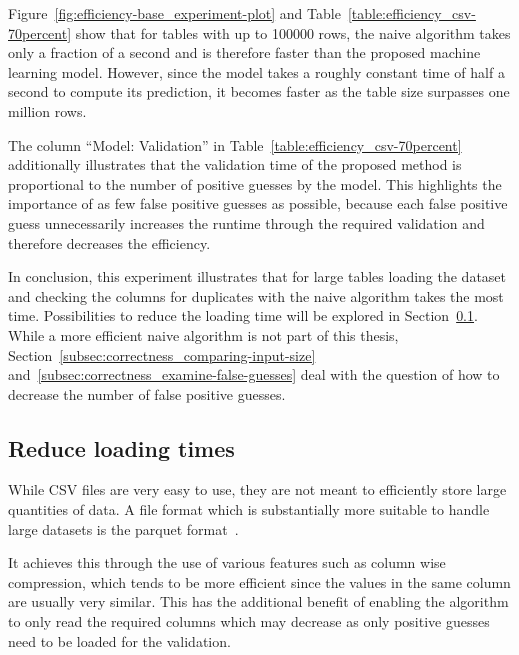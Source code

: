 Figure~\ref{fig:efficiency-base_experiment-plot} and Table~\ref{table:efficiency_csv-70percent} show that for tables with up to \num{100000} rows, the naive algorithm takes only a fraction of a second and is therefore faster than the proposed machine learning model. However, since the model takes a roughly constant time of half a second to compute its prediction, it becomes faster as the table size surpasses one million rows.

The column \enquote{Model: Validation} in Table~\ref{table:efficiency_csv-70percent} additionally illustrates that the validation time of the proposed method is proportional to the number of positive guesses by the model. This highlights the importance of as few false positive guesses as possible, because each false positive guess unnecessarily increases the runtime through the required validation and therefore decreases the efficiency.

In conclusion, this experiment illustrates that for large tables loading the dataset and checking the columns for duplicates with the naive algorithm takes the most time. Possibilities to reduce the loading time will be explored in Section~\ref{subsec:efficiency-shorter_loading_times}. While a more efficient naive algorithm is not part of this thesis, Section~\ref{subsec:correctness_comparing-input-size} and~\ref{subsec:correctness_examine-false-guesses} deal with the question of how to decrease the number of false positive guesses.






\subsection{Reduce loading times}\label{subsec:efficiency-shorter_loading_times}
While CSV files are very easy to use, they are not meant to efficiently store large quantities of data. A file format which is substantially more suitable to handle large datasets is the parquet format~\cite{parquet-book}.

It achieves this through the use of various features such as column wise compression, which tends to be more efficient since the values in the same column are usually very similar. This has the additional benefit of enabling the algorithm to only read the required columns which may decrease \io{} as only positive guesses need to be loaded for the validation.

